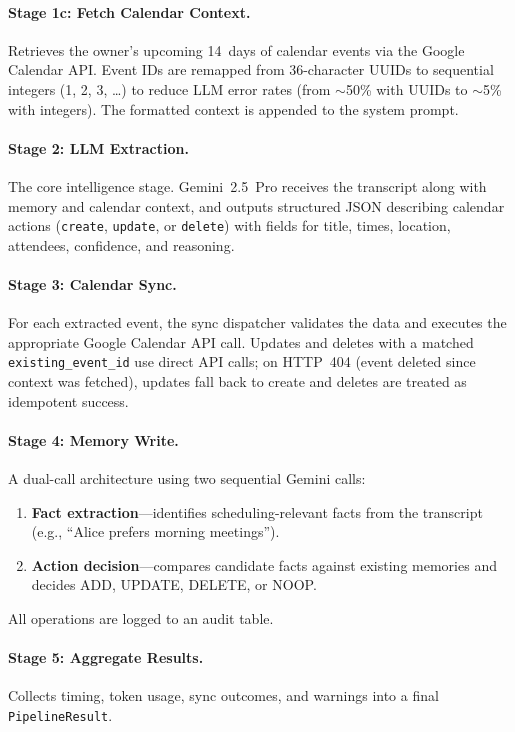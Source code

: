 \documentclass[12pt]{article}
\begin{document}
\paragraph{Stage 1c: Fetch Calendar Context.}
Retrieves the owner's upcoming 14~days of calendar events via the Google
Calendar API. Event IDs are remapped from 36-character UUIDs to sequential
integers (1, 2, 3, \ldots) to reduce LLM error rates (from $\sim$50\%
with UUIDs to $\sim$5\% with integers). The formatted context is appended
to the system prompt.

\paragraph{Stage 2: LLM Extraction.}
The core intelligence stage. Gemini~2.5~Pro receives the transcript along
with memory and calendar context, and outputs structured JSON describing
calendar actions (\texttt{create}, \texttt{update}, or \texttt{delete})
with fields for title, times, location, attendees, confidence, and
reasoning.

\paragraph{Stage 3: Calendar Sync.}
For each extracted event, the sync dispatcher validates the data and
executes the appropriate Google Calendar API call. Updates and deletes
with a matched \texttt{existing\_event\_id} use direct API calls; on
HTTP~404 (event deleted since context was fetched), updates fall back to
create and deletes are treated as idempotent success.

\paragraph{Stage 4: Memory Write.}
A dual-call architecture using two sequential Gemini calls:
\begin{enumerate}
    \item \textbf{Fact extraction}---identifies scheduling-relevant facts
          from the transcript (e.g., ``Alice prefers morning meetings'').
    \item \textbf{Action decision}---compares candidate facts against
          existing memories and decides ADD, UPDATE, DELETE, or NOOP.
\end{enumerate}
All operations are logged to an audit table.

\paragraph{Stage 5: Aggregate Results.}
Collects timing, token usage, sync outcomes, and warnings into a final
\texttt{PipelineResult}.
\end{document}
